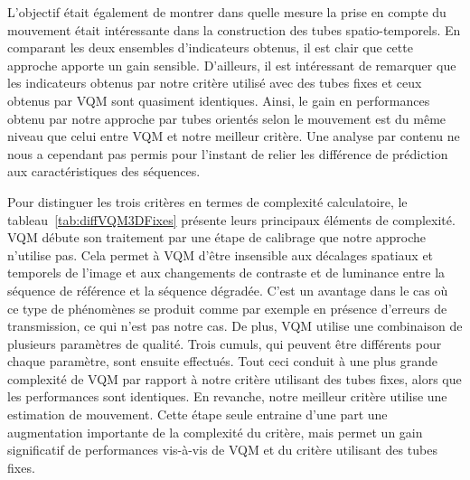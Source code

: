 L'objectif était également de montrer dans quelle mesure la prise en compte du mouvement était intéressante dans la construction des tubes spatio-temporels. En comparant les deux ensembles d'indicateurs obtenus, il est clair que cette approche apporte un gain sensible. D'ailleurs, il est intéressant de remarquer que les indicateurs obtenus par notre critère utilisé avec des tubes fixes et ceux obtenus par VQM sont quasiment identiques. Ainsi, le gain en performances obtenu par notre approche par tubes orientés selon le mouvement est du même niveau que celui entre VQM et notre meilleur critère. Une analyse par contenu ne nous a cependant pas permis pour l'instant de relier les différence de prédiction aux caractéristiques des séquences.

Pour distinguer les trois critères en termes de complexité calculatoire, le tableau~\ref{tab:diffVQM3DFixes} présente leurs principaux éléments de complexité. VQM débute son traitement par une étape de calibrage que notre approche n'utilise pas. Cela permet à VQM d'être insensible aux décalages spatiaux et temporels de l'image et aux changements de contraste et de luminance entre la séquence de référence et la séquence dégradée. C'est un avantage dans le cas où ce type de phénomènes se produit comme par exemple en présence d'erreurs de transmission, ce qui n'est pas notre cas. De plus, VQM utilise une combinaison de plusieurs paramètres de qualité. Trois cumuls, qui peuvent être différents pour chaque paramètre, sont ensuite effectués. Tout ceci conduit à une plus grande complexité de VQM par rapport à notre critère utilisant des tubes fixes, alors que les performances sont identiques. En revanche, notre meilleur critère utilise une estimation de mouvement. Cette étape seule entraine d'une part une augmentation importante de la complexité du critère, mais permet un gain significatif de performances vis-à-vis de VQM et du critère utilisant des tubes fixes.

